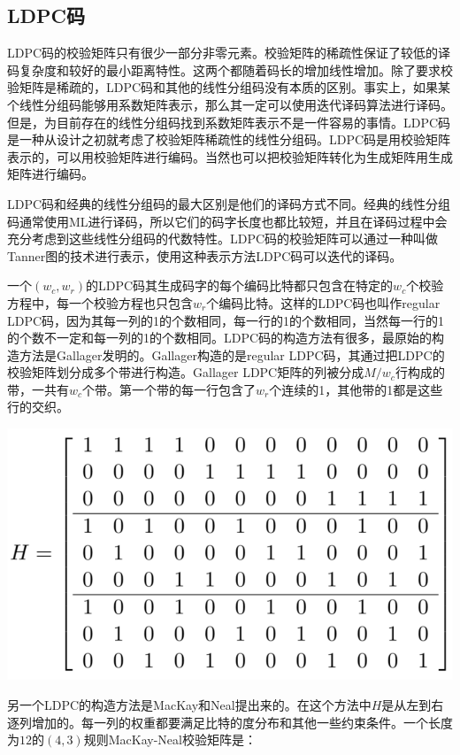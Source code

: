 \documentclass[10pt,a4paper,UTF8]{article}
\begin{document}
\subsection{LDPC码}
\label{sec:org4aa35e9}


LDPC码的校验矩阵只有很少一部分非零元素。校验矩阵的稀疏性保证了较低的译码复杂度和较好的最小距离特性。这两个都随着码长的增加线性增加。除了要求校验矩阵是稀疏的，LDPC码和其他的线性分组码没有本质的区别。事实上，如果某个线性分组码能够用系数矩阵表示，那么其一定可以使用迭代译码算法进行译码。但是，为目前存在的线性分组码找到系数矩阵表示不是一件容易的事情。LDPC码是一种从设计之初就考虑了校验矩阵稀疏性的线性分组码。LDPC码是用校验矩阵表示的，可以用校验矩阵进行编码。当然也可以把校验矩阵转化为生成矩阵用生成矩阵进行编码。

LDPC码和经典的线性分组码的最大区别是他们的译码方式不同。经典的线性分组码通常使用ML进行译码，所以它们的码字长度也都比较短，并且在译码过程中会充分考虑到这些线性分组码的代数特性。LDPC码的校验矩阵可以通过一种叫做Tanner图的技术进行表示，使用这种表示方法LDPC码可以迭代的译码。

一个\((w_{c},w_{r})\)的LDPC码其生成码字的每个编码比特都只包含在特定的\(w_{c}\)个校验方程中，每一个校验方程也只包含\(w_{r}\)个编码比特。这样的LDPC码也叫作regular LDPC码，因为其每一列的1的个数相同，每一行的1的个数相同，当然每一行的1的个数不一定和每一列的1的个数相同。LDPC码的构造方法有很多，最原始的构造方法是Gallager发明的。Gallager构造的是regular LDPC码，其通过把LDPC的校验矩阵划分成多个带进行构造。Gallager LDPC矩阵的列被分成\(M/w_{c}\)行构成的带，一共有\(w_{c}\)个带。第一个带的每一行包含了\(w_{r}\)个连续的1，其他带的1都是这些行的交织。

\begin{center}
\includegraphics[width=.9\linewidth]{../../img/communication_coding/20171018gallagerMatrix.png}
\end{center}

另一个LDPC的构造方法是MacKay和Neal提出来的。在这个方法中\(H\)是从左到右逐列增加的。每一列的权重都要满足比特的度分布和其他一些约束条件。一个长度为\(12\)的\((4,3)\)规则MacKay-Neal校验矩阵是：
\end{document}
